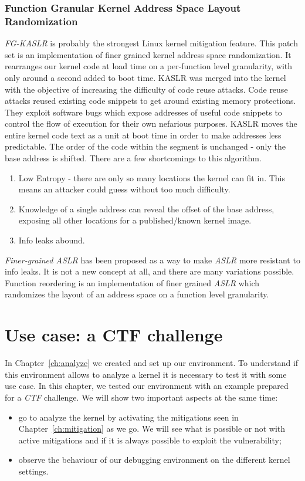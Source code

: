 \documentclass{masterthesis}
\newcommand{\refToChapter}[1]{Chapter~\ref{ch:#1}\xspace}
\begin{document}
\subsection{Function Granular Kernel Address Space Layout Randomization}
\label{subsect:FG-KASLR}
\emph{FG-KASLR} is probably the strongest Linux kernel mitigation feature.
This patch set is an implementation of finer grained kernel address space randomization. It rearranges our kernel code at load time on a per-function level granularity, with only around a second added to boot time.
KASLR was merged into the kernel with the objective of increasing the difficulty of code reuse attacks. Code reuse attacks reused existing code snippets to get around existing memory protections. They exploit software bugs which expose addresses of useful code snippets to control the flow of execution for their own nefarious purposes. KASLR moves the entire kernel
code text as a unit at boot time in order to make addresses less predictable.
The order of the code within the segment is unchanged - only the base address is shifted. There are a few shortcomings to this algorithm.
\begin{enumerate}
\item Low Entropy - there are only so many locations the kernel can fit in. This means an attacker could guess without too much difficulty.
\item Knowledge of a single address can reveal the offset of the base address, exposing all other locations for a published/known kernel image.
\item Info leaks abound.
\end{enumerate}

\emph{Finer-grained ASLR} has been proposed as a way to make \emph{ASLR} more resistant to info leaks. It is not a new concept at all, and there are many variations possible. Function reordering is an implementation of finer grained \emph{ASLR} which randomizes the layout of an address space on a function level granularity.

\chapter{Use case: a CTF challenge}
\label{ch:adding mitigation}
In \refToChapter{analyze} we created and set up our environment. To understand if this environment allows to analyze a kernel it is necessary to test it with some use case.
In this chapter, we tested our environment with an example prepared for a \emph{CTF} challenge. We will show two important aspects at the same time: 
\begin{itemize}
\item go to analyze the kernel by activating the mitigations seen in \refToChapter{mitigation} as we go. We will see what is possible or not with active mitigations and if it is always possible to exploit the vulnerability;
\item observe the behaviour of our debugging environment on the different kernel settings.
\end{itemize}
\end{document}
